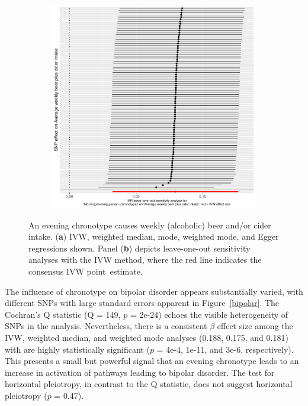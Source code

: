 \documentclass[genes,article,accept,moreauthors,pdftex]{Definitions/mdpi}
\begin{document}
\begin{figure}[H]
{\begin{subfigure}{.5\linewidth}
	\includegraphics[width=0.95\linewidth,keepaspectratio]{Figs/Analysis2/Morning_evening_person_(chronotype)_vs_Average_weekly_beer_plus_cider_intake.LOOplots.pdf}
\caption{}
\label{beerLoo}
\end{subfigure}}
\caption{An evening chronotype causes weekly (alcoholic) beer and/or cider intake. (\textbf{a}) IVW, weighted median, mode, weighted mode, and Egger regressions shown. Panel (\textbf{b}) depicts leave-one-out sensitivity analyses with the IVW method, where the red line indicates the consensus IVW point~estimate.}
\label{beer}
\end{figure}
The influence of chronotype on bipolar disorder appears substantially varied, with different SNPs with large standard errors apparent in Figure~\ref{bipolar}. The Cochran's Q statistic (Q = 149, $p$ = 2e-24) echoes the visible heterogeneity of SNPs in the analysis. Nevertheless, there is a consistent $\beta$ effect size among the IVW, weighted median, and weighted mode analyses (0.188, 0.175, and 0.181) with are highly statistically significant ($p$ = 4e-4, 1e-11, and 3e-6, respectively). This presents a small but powerful signal that an evening chronotype leads to an increase in activation of pathways leading to bipolar disorder. The test for horizontal pleiotropy, in contrast to the Q statistic, does not suggest horizontal pleiotropy ($p$ = 0.47).
\end{document}
